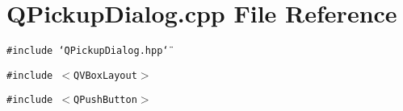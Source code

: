 \section{QPickup\-Dialog.cpp File Reference}
\label{QPickupDialog_8cpp}
{\tt \#include \char`\"{}QPickup\-Dialog.hpp\char`\"{}}\par
{\tt \#include $<$QVBox\-Layout$>$}\par
{\tt \#include $<$QPush\-Button$>$}\par
